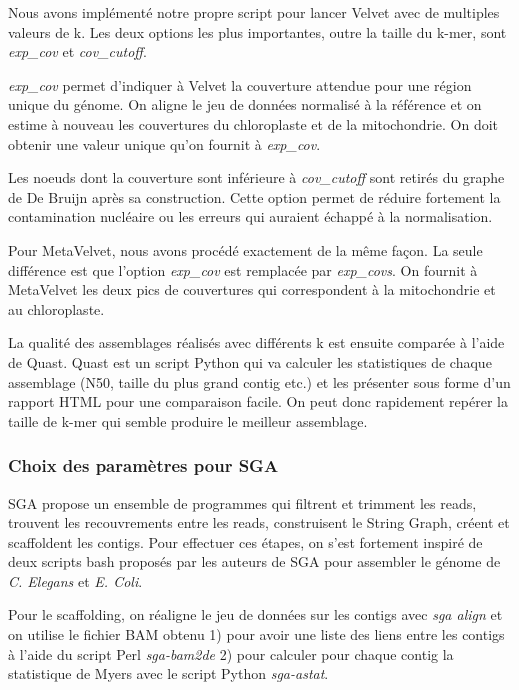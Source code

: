 \documentclass[a4paper]{article}
\begin{document}
Nous avons implémenté notre propre script pour lancer Velvet avec de multiples valeurs de k. Les deux options les plus importantes, outre la taille du k-mer, sont  \textit{exp\_cov} et \textit{cov\_cutoff}. 

\textit{exp\_cov} permet d'indiquer à Velvet la couverture attendue pour une région unique du génome. On aligne le jeu de données normalisé à la référence et on estime à nouveau les couvertures du chloroplaste et de la mitochondrie. On doit obtenir une valeur unique qu'on fournit à \textit{exp\_cov}. 

Les noeuds dont la couverture sont inférieure à \textit{cov\_cutoff} sont retirés du graphe de De Bruijn après sa construction. Cette option permet de réduire fortement la contamination nucléaire ou les erreurs qui auraient échappé à la normalisation.

Pour MetaVelvet, nous avons procédé exactement de la même façon. La seule différence est que l'option \textit{exp\_cov} est remplacée par \textit{exp\_covs}. On fournit à MetaVelvet les deux pics de couvertures qui correspondent à la mitochondrie et au chloroplaste.

La qualité des assemblages réalisés avec différents k est ensuite comparée à l'aide de Quast. Quast est un script Python qui va calculer les statistiques de chaque assemblage (N50, taille du plus grand contig etc.) et les présenter sous forme d'un rapport HTML pour une comparaison facile. On peut donc rapidement repérer la taille de k-mer qui semble produire le meilleur assemblage.

\subsubsection{Choix des paramètres pour SGA}

SGA propose un ensemble de programmes qui filtrent et trimment les reads, trouvent les recouvrements entre les reads, construisent le String Graph, créent et scaffoldent les contigs. Pour effectuer ces étapes, on s'est fortement inspiré de deux scripts bash proposés par les auteurs de SGA pour assembler le génome de \textit{C. Elegans} et \textit{E. Coli}. 

Pour le scaffolding, on réaligne le jeu de données sur les contigs avec \textit{sga align} et on utilise le fichier BAM obtenu 1)
pour avoir une liste des liens entre les contigs à l'aide du script Perl \textit{sga-bam2de} 2) pour calculer pour chaque contig la statistique de Myers avec le script Python \textit{sga-astat}. 
\end{document}
